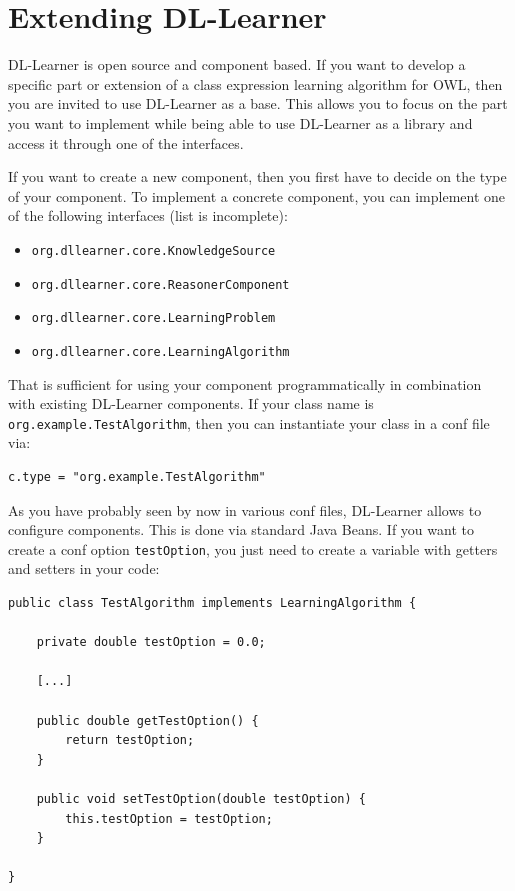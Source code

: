 \documentclass[a4paper,12pt]{scrartcl}
\begin{document}
\section{Extending DL-Learner}
\label{sec:developing}

DL-Learner is open source and component based. If you want to develop a specific part or extension of a class expression learning algorithm for OWL, then you are invited to use DL-Learner as a base. This allows you to focus on the part you want to implement while being able to use DL-Learner as a library and access it through one of the interfaces. 

If you want to create a new component, then you first have to decide on the type of your component. To implement a concrete component, you can implement one of the following interfaces (list is incomplete):

\begin{itemize}
 \item \texttt{org.dllearner.core.KnowledgeSource}
 \item \texttt{org.dllearner.core.ReasonerComponent}
 \item \texttt{org.dllearner.core.LearningProblem}
 \item \texttt{org.dllearner.core.LearningAlgorithm}
\end{itemize}

That is sufficient for using your component programmatically in combination with existing DL-Learner components.
If your class name is \texttt{org.example.TestAlgorithm}, then you can instantiate your class in a conf file via:
\begin{verbatim}
c.type = "org.example.TestAlgorithm"
\end{verbatim}

As you have probably seen by now in various conf files, DL-Learner allows to configure components. This is done via standard Java Beans. If you want to create a conf option 
\texttt{testOption}, you just need to create a variable with getters and setters in your code:

\begin{verbatim}
public class TestAlgorithm implements LearningAlgorithm {

    private double testOption = 0.0;

    [...]

    public double getTestOption() {
        return testOption;
    }

    public void setTestOption(double testOption) {
        this.testOption = testOption;
    }

}
\end{verbatim}
\end{document}
